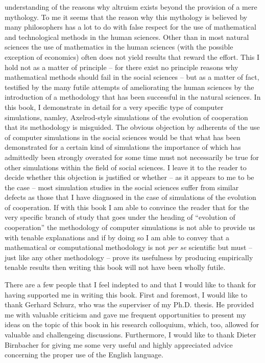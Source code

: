 understanding of the reasons why altruism exists beyond the provision of a mere mythology. To me it seems that the reason why this mythology is believed by many philosophers has a lot to do with false respect for the use of mathematical and technological methods in the human sciences. Other than in most natural sciences the use of mathematics in the human sciences (with the possible exception of economics) often does not yield results that reward the effort. This I hold not as a matter of principle -- for there exist no principle reasons why mathematical methods should fail in the social sciences -- but as a matter of fact, testified by the many futile attempts of ameliorating the human sciences by the introduction of a methodology that has been successful in the natural sciences. In this book, I demonstrate in detail for a very specific type of computer simulations, namley, Axelrod-style simulations of the evolution of cooperation that its methodology is misguided. The obvious objection by adherents of the use of computer simulations in the social sciences would be that what has been demonstrated for a certain kind of simulations the importance of which has admittedly been strongly overated for some time must not necessarily be true for other simulations within the field of social sciences. I leave it to the reader to decide whether this objection is justified or whether -- as it appears to me to be the case -- most simulation studies in the social sciences suffer from similar defects as those that I have diagnosed in the case of simulations of the evolution of cooperation. If with this book I am able to convince the reader that for the very specific branch of study that goes under the heading of ``evolution of cooperation'' the methodology of computer simulations is not able to provide us with tenable explanations and if by doing so I am able to convey that a mathematical or computational methodology is not {\em per se} scientific but must -- just like any other methodology -- prove its usefulness by producing empirically tenable results then writing this book will not have been wholly futile.

There are a few people that I feel indepted to and that I would like to thank for having supported me in writing this book. First and foremost, I would like to thank Gerhard Schurz, who was the superviser of my Ph.D. thesis. He provided me with valuable criticism and gave me frequent opportunities to present my ideas on the topic of this book in his research colloquium, which, too,  allowed for valuable and challengeing discussions. Furthermore, I would like to thank Dieter Birnbacher for giving me some very useful and highly appreciated advice concerning the proper use of the English language.

